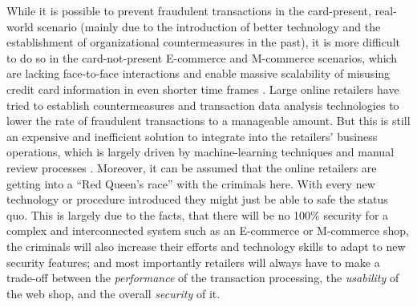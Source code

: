 While it is possible to prevent fraudulent transactions in the card-present, real-world scenario (mainly due to the introduction of better technology and the establishment of organizational countermeasures in the past), it is more difficult to do so in the card-not-present \gls{E-commerce} and \gls{M-commerce} scenarios, which are lacking face-to-face interactions and enable massive scalability of misusing credit card information in even shorter time frames \citep{Lewis2015}. Large online retailers have tried to establish countermeasures and transaction data analysis technologies to lower the rate of fraudulent transactions to a manageable amount. But this is still an expensive and inefficient solution to integrate into the retailers’ business operations, which is largely driven by machine-learning techniques and manual review processes \citep{Brachmann2015}. Moreover, it can be assumed that the online retailers are getting into a ``Red Queen's race'' with the criminals here. With every new technology or procedure introduced they might just be able to safe the status quo. This is largely due to the facts, that there will be no 100\% security for a complex and interconnected system such as an \gls{E-commerce} or \gls{M-commerce} shop, the criminals will also increase their efforts and technology skills to adapt to new security features; and most importantly retailers will always have to make a trade-off between the \emph{performance} of the transaction processing, the \emph{usability} of the web shop, and the overall \emph{security} of it.

